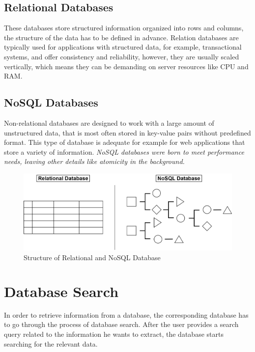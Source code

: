 \documentclass[12pt, a4paper]{article}
\begin{document}
    \subsection{Relational Databases}
        These databases store structured information organized into rows and columns, the structure of the data has to be defined in advance. Relation databases are typically used for applications with structured data, for example, transactional systems, and offer consistency and reliability, however, they are usually scaled vertically, which means they can be demanding on server resources like CPU and RAM.

    \subsection{NoSQL Databases}
        Non-relational databases are designed to work with a large amount of unstructured data, that is most often stored in key-value pairs without predefined format. This type of database is adequate for example for web applications that store a variety of information. \textit{NoSQL databases were born to meet performance needs, leaving other details like atomicity in the background.}\cite{06}\\
        \begin{figure}[h]
            \centering
            \includegraphics[width=1\linewidth]{images/relational-nosql.png}
            \caption{Structure of Relational and NoSQL Database\cite{102}}
            \label{fig:structure}
        \end{figure}
\clearpage

\section{Database Search}
    In order to retrieve information from a database, the corresponding database has to go through the process of database search. After the user provides a search query related to the information he wants to extract, the database starts searching for the relevant data. 
    
\end{document}
